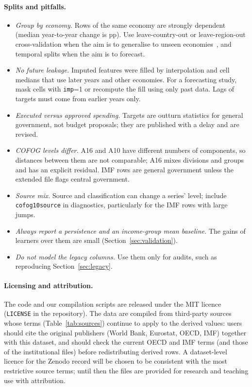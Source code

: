 \documentclass[11pt,a4paper]{article}
\DeclareRobustCommand*{\_}{\textunderscore\hskip0pt\relax}
\begin{document}
\paragraph{Splits and pitfalls.}
\begin{itemize}[leftmargin=1.4em,itemsep=1pt,parsep=0pt]
\item \emph{Group by economy.} Rows of the same economy are strongly dependent (median year-to-year change is \DJumpMed{} pp). Use leave-country-out or leave-region-out cross-validation when the aim is to generalise to unseen economies~\cite{roberts2017}, and temporal splits when the aim is to forecast.
\item \emph{No future leakage.} Imputed features were filled by interpolation and cell medians that use later years and other economies. For a forecasting study, mask cells with \texttt{imp\_*}=1 or recompute the fill using only past data. Lags of targets must come from earlier years only.
\item \emph{Executed versus approved spending.} Targets are outturn statistics for general government, not budget proposals; they are published with a delay and are revised.
\item \emph{COFOG levels differ.} A16 and A10 have different numbers of components, so distances between them are not comparable; A16 mixes divisions and groups and has an explicit residual. IMF rows are general government unless the extended file flags central government.
\item \emph{Source mix.} Source and classification can change a series' level; include \texttt{cofog10\_source} in diagnostics, particularly for the IMF rows with large jumps.
\item \emph{Always report a persistence and an income-group mean baseline.} The gains of learners over them are small (Section~\ref{sec:validation}).
\item \emph{Do not model the legacy columns.} Use them only for audits, such as reproducing Section~\ref{sec:legacy}.
\end{itemize}
\paragraph{Licensing and attribution.} The code and our compilation scripts are released under the MIT licence (\texttt{LICENSE} in the repository). The data are compiled from third-party sources whose terms (Table~\ref{tab:sources}) continue to apply to the derived values: users should cite the original publishers (World Bank, Eurostat, OECD, IMF) together with this dataset, and should check the current OECD and IMF terms (and those of the institutional files) before redistributing derived rows. A dataset-level licence for the Zenodo record will be chosen to be consistent with the most restrictive source terms; until then the files are provided for research and teaching use with attribution.
\end{document}
